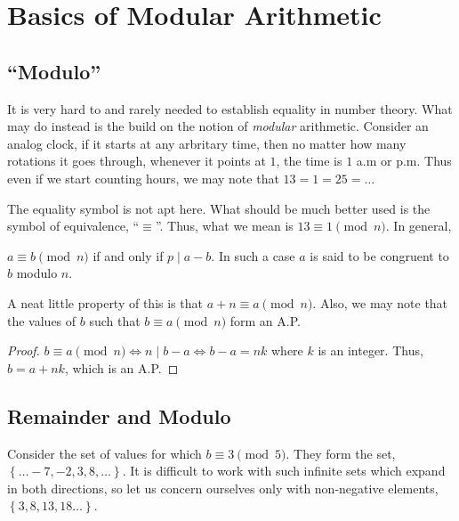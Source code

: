 \chapter{Basics of Modular Arithmetic}
\label{nt: modbasic}

\section{``Modulo''}

It is very hard to and rarely needed to establish equality in number theory. What may do instead
is the build on the notion of \emph{modular} arithmetic. Consider an analog clock, if it starts
at any arbritary time, then no matter how many rotations it goes through, whenever it points at 
\(1\), the time is \(1\) a.m or p.m. Thus even if we start counting hours, we may note that
\(13 = 1 = 25 = \dots\)                                                                                                                                                                                       
\parbreak

The equality symbol is not apt here. What should be much better used is the symbol of equivalence,
``\(\equiv\)''. Thus, what we mean is \(13 \equiv 1 \pmod{n}\). In general,

\begin{definition}
    [Congruent]
    \(a \equiv b \pmod{n}\) if and only if \(p \mid a - b\). In such a case \(a\) is said to be 
    congruent to \(b\) modulo \(n\).
\end{definition}

A neat little property of this is that \(a + n \equiv a \pmod{n}\). Also, we may note that
the values of \(b\) such that \(b \equiv a \pmod{n}\) form an A.P.

\begin{proof}
    \(b \equiv a \pmod{n} \iff n \mid b - a \iff b - a = nk\) where \(k\) is an integer. Thus,
    \(b = a + nk\), which is an A.P.
\end{proof}

\section{Remainder and Modulo}

Consider the set of values for which \(b \equiv 3 \pmod{5}\). They form the set, \(\left\{\dots
-7, -2, 3, 8, \dots \right\}\). It is difficult to work with such infinite sets which expand
in both directions, so let us concern ourselves only with non-negative elements, \(\left\{
3, 8, 13, 18 \dots \right\}\). 

